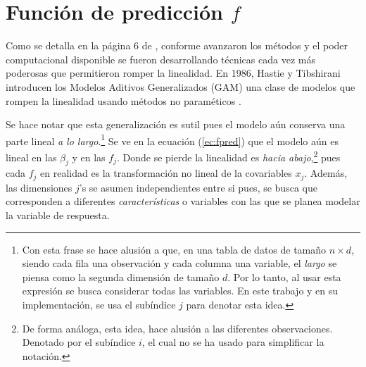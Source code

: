\documentclass[../Main/Main.tex]{subfiles}
\begin{document}

\section{Función de predicción $f$} \label{sec:FuncPred} 
Como se detalla en la página 6 de \citet{james2013introduction}, conforme avanzaron los métodos y el poder computacional disponible se fueron desarrollando técnicas cada vez más poderosas que permitieron romper la linealidad. En 1986, Hastie y Tibshirani introducen los Modelos Aditivos Generalizados (GAM) una clase de modelos que rompen la linealidad usando métodos no paraméticos \autocite{hastie1986generalized}. 

Se hace notar que esta generalización es sutil pues el modelo aún conserva una parte lineal \textit{a lo largo}.\footnote{Con esta frase se hace alusión a que, en una tabla de datos de tamaño $n \times d$, siendo cada fila una observación y cada columna una variable, el \textit{largo} se piensa como la segunda dimensión de tamaño $d$. Por lo tanto, al usar esta expresión se busca considerar todas las variables. En este trabajo y en su implementación, se usa el subíndice $j$ para denotar esta idea.} Se ve en la ecuación (\ref{ec:fpred}) que el modelo aún es lineal en las $\beta_j$ y en las $f_j$. Donde se pierde la linealidad es \textit{hacia abajo},\footnote{De forma análoga, esta idea, hace alusión a las diferentes observaciones. Denotado por el subíndice $i$, el cual no se ha usado para simplificar la notación.} pues cada $f_j$ en realidad es la transformación no lineal de la covariables $x_j$. Además, las dimensiones $j$'s se asumen independientes entre si pues, se busca que corresponden a diferentes \textit{características} o variables con las que se planea modelar la variable de respuesta.
\end{document}
